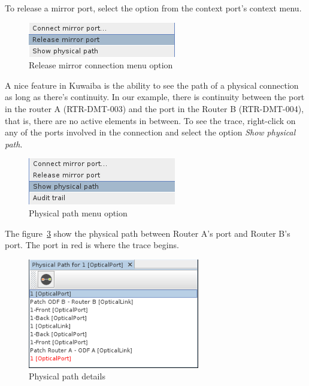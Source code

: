 \documentclass[a4paper]{article}
\begin{document}
\begin{enumerate}
					To release a mirror port, select the option from the context port's context menu.
					\begin{figure}[h!]
						\centering
						\includegraphics[width=0.3\linewidth]{img/l1_example_2_mirror_connection_release.png}
						\caption{Release mirror connection menu option}
						\label{fig:l1_example_2_mirror_connection_release}
					\end{figure}
			\end{enumerate}
			
			A nice feature in Kuwaiba is the ability to see the path of a physical connection as long as there's continuity. In our example, there is continuity between the port in the router A (RTR-DMT-003) and the port in the Router B (RTR-DMT-004), that is, there are no active elements in between. To see the trace, right-click on any of the ports involved in the connection and select the option \textit{Show physical path}.
			\begin{figure}[h!]
				\centering
				\includegraphics[width=0.3\linewidth]{img/l1_example_2_physical_path_menu.png}
				\caption{Physical path menu option}
				\label{fig:l1_example_2_physical_path_menu}
			\end{figure}
			The figure~\ref{fig:l1_example_2_physical_path_list} show the physical path between Router A's port and Router B's port. The port in red is where the trace begins.
			\begin{figure}[h!]
				\centering
				\includegraphics[width=0.4\linewidth]{img/l1_example_2_physical_path_list.png}
				\caption{Physical path details}
				\label{fig:l1_example_2_physical_path_list}
			\end{figure}
			
\end{document}
